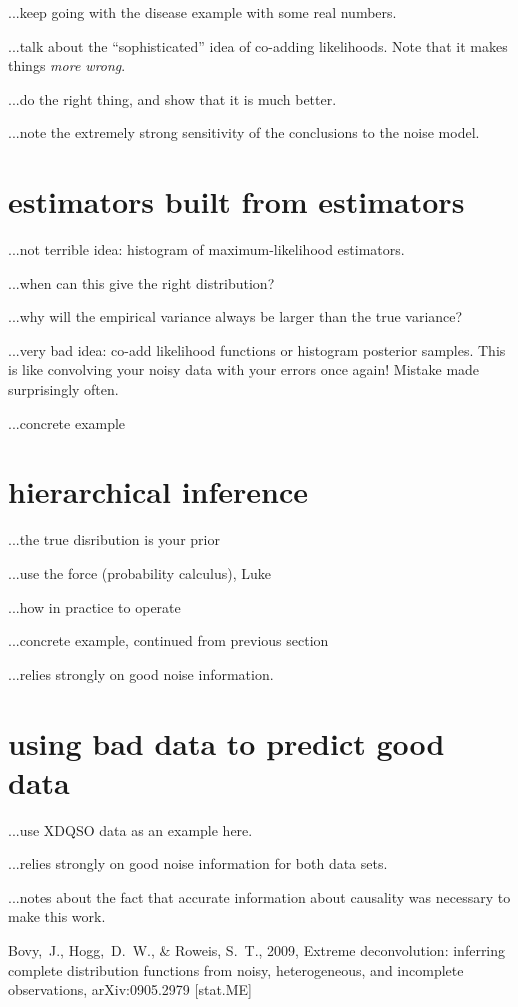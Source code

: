 \documentclass[12pt,twoside]{article}
\begin{document}
...keep going with the disease example with some real numbers.

...talk about the ``sophisticated'' idea of co-adding likelihoods.
Note that it makes things \emph{more wrong}.

...do the right thing, and show that it is much better.

...note the extremely strong sensitivity of the conclusions to the
noise model.

\section{estimators built from estimators}

...not terrible idea: histogram of maximum-likelihood estimators.

...when can this give the right distribution?

...why will the empirical variance always be larger than the true variance?

...very bad idea: co-add likelihood functions or histogram posterior
samples.  This is like convolving your noisy data with your errors
once again!  Mistake made surprisingly often.

...concrete example

\section{hierarchical inference}

...the true disribution is your prior

...use the force (probability calculus), Luke

...how in practice to operate

...concrete example, continued from previous section

...relies strongly on good noise information.

\section{using bad data to predict good data}

...use XDQSO data as an example here.

...relies strongly on good noise information for both data sets.

...notes about the fact that accurate information about causality was
necessary to make this work.

\clearpage
{}\theendnotes

\clearpage
\begin{thebibliography}{}
  Bovy,~J., Hogg,~D.~W., \& Roweis, S.~T., 2009,
  Extreme deconvolution: inferring complete distribution functions from noisy, heterogeneous, and incomplete observations, 
  arXiv:0905.2979 [stat.ME]
\end{thebibliography}
\end{document}
